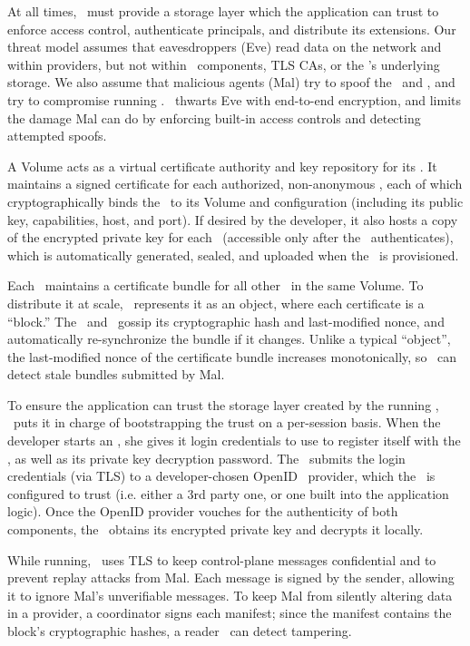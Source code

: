 At all times, \Syndicate\ must provide a storage layer which the application 
can trust to enforce access control, authenticate principals, and distribute its extensions.
Our threat model assumes that eavesdroppers (Eve) read data on the network and within providers, but not 
within \Syndicate\ components, TLS CAs, or the \MS's underlying storage.  We also assume that malicious 
agents (Mal) try to spoof the \MS\ and \SGs, and try to compromise running \SGs.
\Syndicate\ thwarts Eve with end-to-end encryption, and limits the damage 
Mal can do by enforcing built-in access controls and detecting attempted spoofs.

A Volume acts as a virtual certificate authority and key repository for
its \SGs.  It maintains a signed certificate for each authorized, non-anonymous \SG, 
each of which cryptographically binds the \SG\ to its Volume and configuration (including
its public key, capabilities, host, and port).  If desired by the developer, it also 
hosts a copy of the encrypted private key
for each \SG\ (accessible only after the \SG\ authenticates), which is automatically
generated, sealed, and uploaded when the \SG\ is provisioned.

Each \SG\ maintains a certificate bundle for all other \SGs\ in the same Volume.
To distribute it at scale, \Syndicate\ represents it as an object,
where each certificate is a ``block.''
The \MS\ and \SGs\ gossip its cryptographic hash and last-modified nonce,
and automatically re-synchronize the bundle if it changes.  Unlike a typical 
``object'', the last-modified nonce of the certificate bundle increases monotonically,
so \SGs\ can detect stale bundles submitted by Mal.

To ensure the application can trust the storage layer created by the running \SGs,
\Syndicate\ puts it in charge of bootstrapping the trust on a per-session basis.
When the developer starts an \SG, she gives it login
credentials to use to register itself with the \MS, as well 
as its private key decryption password.  The \SG\ 
submits the login credentials (via TLS) to a developer-chosen OpenID~\cite{openid} provider,
which the \MS\ is configured to trust
(i.e. either a 3rd party one, or one built into the application logic).
Once the OpenID provider vouches for the authenticity of both components,
the \SG\ obtains its encrypted private key and decrypts it locally.

While running, \Syndicate\ uses TLS to keep control-plane messages
confidential and to prevent replay attacks from Mal.  Each message is
signed by the sender, allowing it to ignore Mal's unverifiable
messages.  To keep Mal from silently altering data in a provider, a coordinator
signs each manifest; since the manifest contains the block's cryptographic hashes,
a reader \SG\ can detect tampering.

